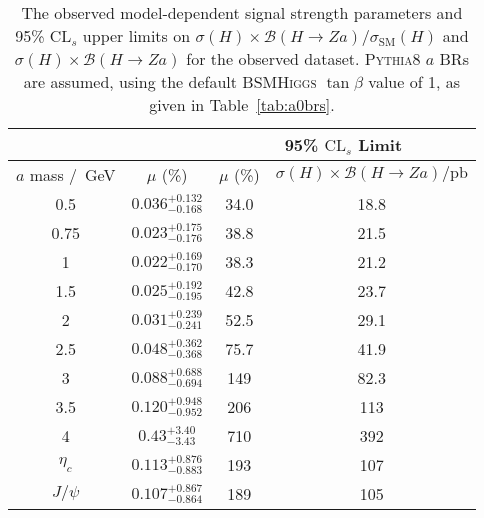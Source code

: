 \documentclass[NOTE, atlasdraft=true, texlive=2017, UKenglish]{\ATLASLATEXPATH atlasdoc}
\begin{document}
\begin{table}[!htbp]{\footnotesize\renewcommand{\arraystretch}{1.2} %
  \begin{center}
    \footnotesize
    \begin{tabular}{|c|c|cc|}
      \cline{3-4}
      \multicolumn{2}{c}{} & \multicolumn{2}{|c|}{95\% $\text{CL}_s$ Limit}\\
      \hline
      $a$ mass /~GeV & $\mu$ (\%) & $\mu$ (\%) & $\sigma(H)\times \mathcal{B}(H\to Za)/\text{pb}$ \\
      \hline
      0.5  & $0.036^{+0.132}_{-0.168}$ & 34.0 & 18.8 \\
      0.75 & $0.023^{+0.175}_{-0.176}$ & 38.8 & 21.5 \\
      1    & $0.022^{+0.169}_{-0.170}$ & 38.3 & 21.2 \\
      1.5  & $0.025^{+0.192}_{-0.195}$ & 42.8 & 23.7 \\
      2    & $0.031^{+0.239}_{-0.241}$ & 52.5 & 29.1 \\
      2.5  & $0.048^{+0.362}_{-0.368}$ & 75.7 & 41.9 \\
      3    & $0.088^{+0.688}_{-0.694}$ & 149 & 82.3  \\
      3.5  & $0.120^{+0.948}_{-0.952}$ & 206 & 113  \\ %
      4    & $0.43^{+3.40}_{-3.43}$    & 710 & 392  \\ %
      \hline
      $\eta_c$ & $0.113^{+0.876}_{-0.883}$ & 193 & 107 \\
      $J/\psi$ & $0.107^{+0.867}_{-0.864}$ & 189 & 105 \\
      \hline
    \end{tabular}
    \caption{The observed model-dependent signal strength parameters and 95\% $\text{CL}_s$ upper limits on $\sigma(H) \times\mathcal{B}(H\to Za) / \sigma_\text{SM}(H)$ and $\sigma(H)\times \mathcal{B}(H\to Za)$ for the observed dataset. \textsc{Pythia}8 $a$ BRs are assumed, using the default \textsc{BSMHiggs} $\tan\beta$ value of 1, as given in Table~\ref{tab:a0brs}.}
    \label{tab:observedmodeldepedentresults}
  \end{center}}
\end{table}
\end{document}
